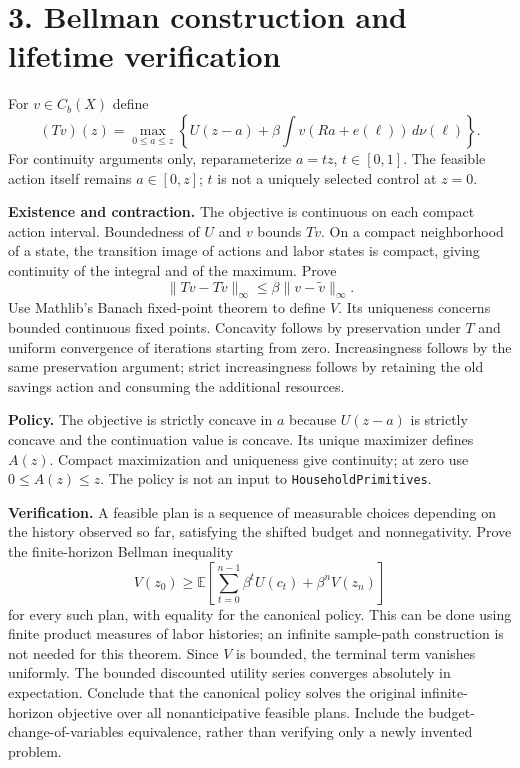 \documentclass[
  11pt,
]{article}
\begin{document}
\section{3. Bellman construction and lifetime
verification}\label{bellman-construction-and-lifetime-verification}

For \(v\in C_b(X)\) define \[
(Tv)(z)=\max_{0\leq a\leq z}\left\{U(z-a)+\beta\int v(Ra+e(\ell))\,d\nu(\ell)\right\}.
\] For continuity arguments only, reparameterize \(a=tz\),
\(t\in[0,1]\). The feasible action itself remains \(a\in[0,z]\); \(t\)
is not a uniquely selected control at \(z=0\).

\textbf{Existence and contraction.} The objective is continuous on each
compact action interval. Boundedness of \(U\) and \(v\) bounds \(Tv\).
On a compact neighborhood of a state, the transition image of actions
and labor states is compact, giving continuity of the integral and of
the maximum. Prove \[
\|Tv-T\widetilde v\|_\infty\leq\beta\|v-\widetilde v\|_\infty.
\] Use Mathlib's Banach fixed-point theorem to define \(V\). Its
uniqueness concerns bounded continuous fixed points. Concavity follows
by preservation under \(T\) and uniform convergence of iterations
starting from zero. Increasingness follows by the same preservation
argument; strict increasingness follows by retaining the old savings
action and consuming the additional resources.

\textbf{Policy.} The objective is strictly concave in \(a\) because
\(U(z-a)\) is strictly concave and the continuation value is concave.
Its unique maximizer defines \(A(z)\). Compact maximization and
uniqueness give continuity; at zero use \(0\leq A(z)\leq z\). The policy
is not an input to \texttt{HouseholdPrimitives}.

\textbf{Verification.} A feasible plan is a sequence of measurable
choices depending on the history observed so far, satisfying the shifted
budget and nonnegativity. Prove the finite-horizon Bellman inequality \[
V(z_0)\geq\mathbb E\!\left[\sum_{t=0}^{n-1}\beta^tU(c_t)+\beta^nV(z_n)\right]
\] for every such plan, with equality for the canonical policy. This can
be done using finite product measures of labor histories; an infinite
sample-path construction is not needed for this theorem. Since \(V\) is
bounded, the terminal term vanishes uniformly. The bounded discounted
utility series converges absolutely in expectation. Conclude that the
canonical policy solves the original infinite-horizon objective over all
nonanticipative feasible plans. Include the budget-change-of-variables
equivalence, rather than verifying only a newly invented problem.
\end{document}
